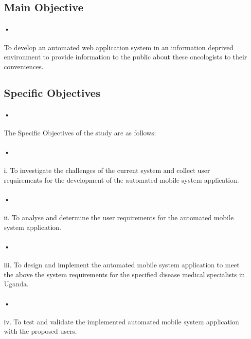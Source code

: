 \documentclass[12pt]{article}
\begin{document}
\subsection{Main Objective}
\paragraph{•}To develop an automated web application system in an information deprived environment to provide information to the public about these oncologists to their conveniences.


\subsection{Specific Objectives}
\paragraph{•}The Specific Objectives of the study are as follows:
\paragraph{•}i.	To investigate the challenges of the current system and collect user requirements for the development of the automated mobile system application.
\paragraph{•}ii.	To analyse and determine the user requirements for the automated mobile system application.
\paragraph{•}iii.	To design and implement the automated mobile system application to meet the above the system requirements for the specified disease medical specialists in Uganda.  
\paragraph{•}iv.	To test and validate the implemented automated mobile system application with the proposed users.
\end{document}
